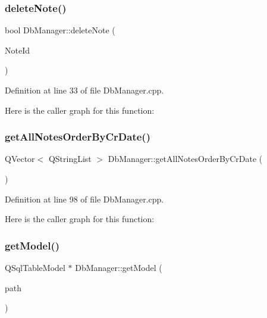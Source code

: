 \subsubsection{\texorpdfstring{delete\+Note()}{deleteNote()}}
{\footnotesize\ttfamily bool Db\+Manager\+::delete\+Note (\begin{DoxyParamCaption}\item[{int}]{Note\+Id }\end{DoxyParamCaption})\hspace{0.3cm}{\ttfamily [static]}}



Definition at line 33 of file Db\+Manager.\+cpp.

Here is the caller graph for this function\+:
\hypertarget{classDbManager_a9b35a902ca6a35cd2589a3d1fffda94b}{}\label{classDbManager_a9b35a902ca6a35cd2589a3d1fffda94b} 
\subsubsection{\texorpdfstring{get\+All\+Notes\+Order\+By\+Cr\+Date()}{getAllNotesOrderByCrDate()}}
{\footnotesize\ttfamily Q\+Vector$<$ Q\+String\+List $>$ Db\+Manager\+::get\+All\+Notes\+Order\+By\+Cr\+Date (\begin{DoxyParamCaption}{ }\end{DoxyParamCaption})\hspace{0.3cm}{\ttfamily [static]}}



Definition at line 98 of file Db\+Manager.\+cpp.

Here is the caller graph for this function\+:
\hypertarget{classDbManager_ac4e759380194e624382e267432de5357}{}\label{classDbManager_ac4e759380194e624382e267432de5357} 
\subsubsection{\texorpdfstring{get\+Model()}{getModel()}}
{\footnotesize\ttfamily Q\+Sql\+Table\+Model $\ast$ Db\+Manager\+::get\+Model (\begin{DoxyParamCaption}\item[{const Q\+String \&}]{path }\end{DoxyParamCaption})\hspace{0.3cm}{\ttfamily [static]}}



